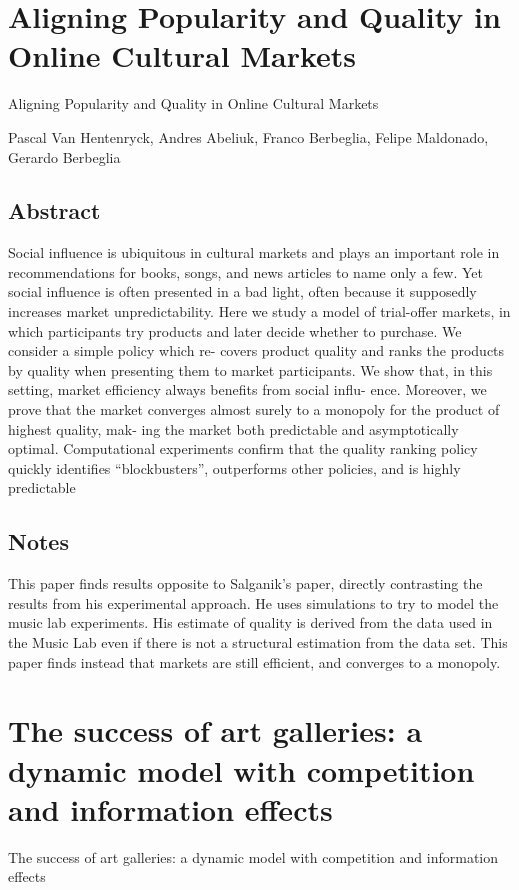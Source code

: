 \documentclass[12pt]{article}
\begin{document}
\section{Aligning Popularity and Quality in Online Cultural Markets}
Aligning Popularity and Quality in Online Cultural Markets\par

Pascal Van Hentenryck, Andres Abeliuk, Franco Berbeglia, Felipe
Maldonado, Gerardo Berbeglia\par

\subsection{Abstract}
Social influence is ubiquitous in cultural markets and plays
an important role in recommendations for books, songs, and
news articles to name only a few. Yet social influence is often
presented in a bad light, often because it supposedly increases
market unpredictability. Here we study a model of trial-offer
markets, in which participants try products and later decide
whether to purchase. We consider a simple policy which re-
covers product quality and ranks the products by quality when
presenting them to market participants. We show that, in this
setting, market efficiency always benefits from social influ-
ence. Moreover, we prove that the market converges almost
surely to a monopoly for the product of highest quality, mak-
ing the market both predictable and asymptotically optimal.
Computational experiments confirm that the quality ranking
policy quickly identifies ``blockbusters'', outperforms other
policies, and is highly predictable

\subsection{Notes}

This paper finds results opposite to Salganik's paper, directly
contrasting the results from his experimental approach. He uses
simulations to try to model the music lab experiments. His estimate of
quality is derived from the data used in the Music Lab even if there
is not a structural estimation from the data set. This paper finds
instead that markets are still efficient, and converges to a monopoly.

\section{The success of art galleries: a dynamic model with competition and information effects
}
The success of art galleries: a dynamic model with competition and
information effects\par
\end{document}

